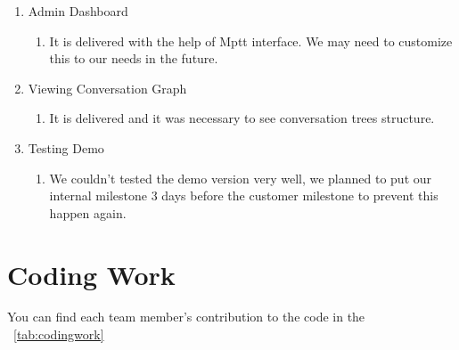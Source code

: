 \documentclass[a4paper]{article}
\begin{document}
\begin{enumerate}
 	\item	Admin Dashboard
 	\begin{enumerate}
 \item	It is delivered with the help of Mptt interface. We may need to customize this to our needs in the future. 
 		\end{enumerate}
 		\item	Viewing Conversation Graph
 		\begin{enumerate}
 	\item	It is delivered and it was necessary to see conversation trees structure.
 			\end{enumerate}
 			\item	Testing Demo
 			\begin{enumerate}
 	  \item  We couldn't tested the demo version very well, we planned to put our internal milestone 3 days before the customer milestone to prevent this happen again.
 	    \end{enumerate}
 	    \end{enumerate}
\newpage
\section{Coding Work}
You can find each team member's contribution to the code in the ~\autoref{tab:codingwork}
\end{document}
